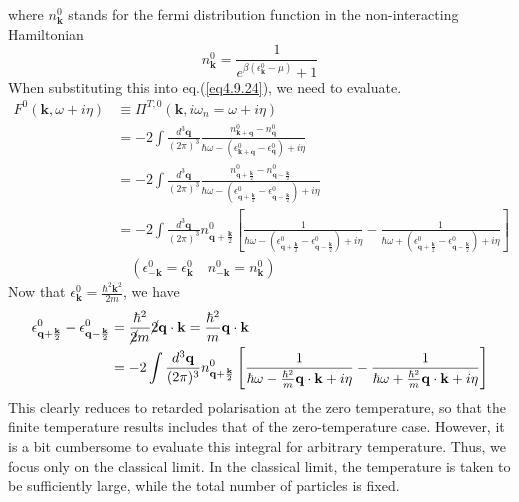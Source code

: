  where $n_{\mathbf k}^0$ stands for the fermi distribution function in the non-interacting Hamiltonian
\[
n^0_{\mathbf k}=\frac{1}{e^{\beta(\epsilon_{\mathbf k}^0-\mu)}+1}
\]
 When substituting this into eq.(\ref{eq4.9.24}), we need to evaluate.
\[
\begin{aligned}
F^0(\mathbf k,\omega+i\eta)&\equiv\Pi^{T,0}(\mathbf k,i\omega_n=\omega+i\eta)\\
&=-2\int \frac{d^3\mathbf q}{(2\pi)^3} \frac{n^0_{\mathbf k+\mathbf q}-n^0_{\mathbf q}}{\hbar\omega-(\epsilon^0_{\mathbf k+\mathbf q}-\epsilon^0_{\mathbf q})+i\eta}\\
&=-2\int \frac{d^3\mathbf q}{(2\pi)^3} \frac{n^0_{\mathbf q+\frac{\mathbf k}{2}}-n^0_{\mathbf q-\frac{\mathbf k}{2}}}{\hbar\omega-(\epsilon^0_{\mathbf q+\frac{\mathbf k}{2}}-\epsilon^0_{\mathbf q-\frac{\mathbf k}{2}})+i\eta}\\
&=-2\int \frac{d^3\mathbf q}{(2\pi)^3} n^0_{\mathbf q+\frac{\mathbf k}{2}} \left[ \frac{1}{\hbar \omega-(\epsilon^0_{\mathbf q+\frac{\mathbf k}{2}}-\epsilon^0_{\mathbf q-\frac{\mathbf k}{2}})+i\eta}-\frac{1}{\hbar \omega+(\epsilon^0_{\mathbf q+\frac{\mathbf k}{2}}-\epsilon^0_{\mathbf q-\frac{\mathbf k}{2}})+i\eta} \right]\\
&\quad(\epsilon^0_{-\mathbf k}=\epsilon^0_{\mathbf k}\quad n^0_{-\mathbf k} =n^0_{\mathbf k}) 
\end{aligned}
\]
Now that $\epsilon_{\mathbf k}^0=\frac{\hbar^2 \mathbf k^2}{2m}$, we have 
\begin{equation}
\begin{aligned}
\epsilon^0_{\mathbf q+\frac{\mathbf k}{2}}-\epsilon^0_{\mathbf q-\frac{\mathbf k}{2}}&=\frac{\hbar^2}{\cancel{2}m}\cancel{2}\mathbf q\cdot \mathbf k=\frac{\hbar^2}{m}\mathbf q\cdot \mathbf k\\
&=-2\int \frac{d^3\mathbf q}{(2\pi)^3} n^0_{\mathbf q+\frac{\mathbf k}{2}} \left[ \frac{1}{\hbar \omega-\frac{\hbar^2}{m} \mathbf q\cdot\mathbf k+i\eta}-\frac{1}{\hbar \omega+\frac{\hbar^2}{m} \mathbf q\cdot\mathbf k+i\eta} \right]
\end{aligned}
\end{equation}
 This clearly reduces to retarded polarisation at the zero temperature, so that the finite temperature results includes that of the zero-temperature case.
 However, it is a bit cumbersome to evaluate this integral for arbitrary temperature.
 Thus, we focus only on the classical limit.
 In the classical limit, the temperature is taken to be sufficiently large, while the total number of particles is fixed.
